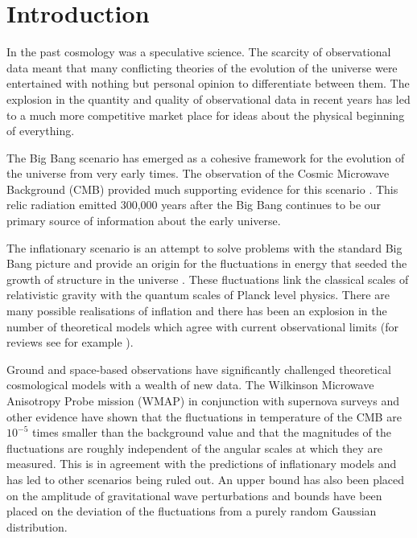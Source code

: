 \renewcommand{\CVSrevision}%
{\version$Id: shortintro.tex,v 1.6 2009/10/19 09:28:32 ith Exp $}

\chapter{Introduction}
\label{ch:shortintro}
In the past cosmology was a speculative science. The scarcity of observational
data meant that many conflicting theories of the evolution of the universe were
entertained with nothing but personal opinion to differentiate between them.
The explosion in the quantity and quality of observational data in recent years
has led to a much more competitive market place for ideas about the physical
beginning of everything.

The Big Bang scenario has emerged as a cohesive framework for the evolution of
the universe from very early times. The observation of the Cosmic
Microwave Background (CMB) provided much supporting evidence for this scenario
\cite{book:kolbturner}. This
relic radiation emitted 300,000 years after the Big Bang continues to
be our primary source of information about the early universe.

The inflationary scenario is an attempt to solve problems with the standard Big
Bang picture and provide an origin for the fluctuations in energy that seeded
the growth of structure in the universe
\cite{Starobinsky:1980te,Guth:1980zm,Albrecht:1982wi,Linde:1981mu,
Starobinsky:1982ee}. These fluctuations link the classical scales of
relativistic gravity with the quantum scales of Planck level physics. There are
many possible realisations of inflation and there has been an explosion in the
number of theoretical models which agree with current observational limits
(for reviews see for example \cite{book:liddle, Alabidi:2008ej, Baumann2009}).

Ground and space-based observations have significantly challenged theoretical
cosmological models with a wealth of new data. The Wilkinson Microwave
Anisotropy Probe mission (WMAP) \cite{Komatsu:2008hk} in conjunction with supernova
surveys and other evidence have shown that the fluctuations in
temperature of the CMB are $10^{-5}$ times smaller than the background value
and that the magnitudes of the fluctuations are roughly independent of the
angular scales at which they are measured. This is in agreement with the
predictions of inflationary models and has led to other scenarios being ruled
out. An upper bound has also been placed
on the amplitude of gravitational wave perturbations and bounds have been
placed on the deviation of the fluctuations from a purely random Gaussian
distribution.


